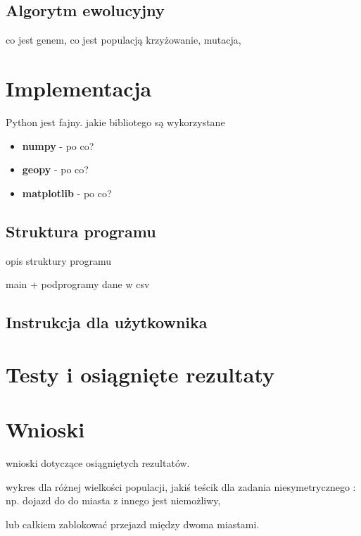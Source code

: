 \documentclass[12pt, oneside, final]{report}
\begin{document}
\subsection{Algorytm ewolucyjny}
co jest genem,
co jest populacją
krzyżowanie,
mutacja,


\section{Implementacja}
Python jest fajny. jakie bibliotego są wykorzystane
\begin{itemize}
\item \textbf{numpy} - po co?
\item \textbf{geopy} - po co?
\item \textbf{matplotlib} - po co?
\end{itemize}

\subsection{Struktura programu}
opis struktury programu

main + podprogramy
dane w csv

\subsection{Instrukcja dla użytkownika}

\section{Testy i osiągnięte rezultaty}

\section{Wnioski}
wnioski dotyczące osiągniętych rezultatów. 

wykres dla różnej wielkości populacji,
jakiś teścik dla zadania niesymetrycznego : np. dojazd do do miasta z innego jest niemożliwy,

lub całkiem zablokować przejazd między dwoma miastami.
\end{document}
